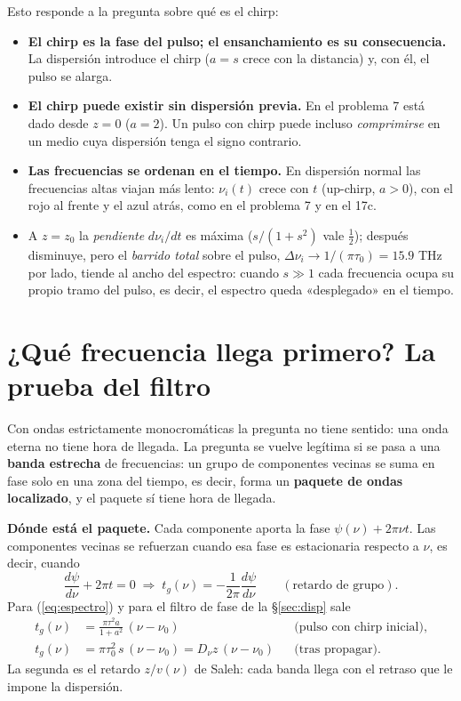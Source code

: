 \documentclass[11pt]{article}
\begin{document}
Esto responde a la pregunta sobre qué es el chirp:
\begin{itemize}
\item \textbf{El chirp es la fase del pulso; el ensanchamiento es su consecuencia.} La dispersión introduce el chirp ($a=s$ crece con la distancia) y, con él, el pulso se alarga.
\item \textbf{El chirp puede existir sin dispersión previa.} En el problema 7 está dado desde $z=0$ ($a=2$). Un pulso con chirp puede incluso \emph{comprimirse} en un medio cuya dispersión tenga el signo contrario.
\item \textbf{Las frecuencias se ordenan en el tiempo.} En dispersión normal las frecuencias altas viajan más lento: $\nu_i(t)$ crece con $t$ (up-chirp, $a>0$), con el rojo al frente y el azul atrás, como en el problema 7 y en el 17c.
\item A $z=z_0$ la \emph{pendiente} $d\nu_i/dt$ es máxima ($s/(1+s^2)$ vale $\tfrac12$); después disminuye, pero el \emph{barrido total} sobre el pulso, $\Delta\nu_i\to1/(\pi\tau_0)=15.9$ THz por lado, tiende al ancho del espectro: cuando $s\gg1$ cada frecuencia ocupa su propio tramo del pulso, es decir, el espectro queda «desplegado» en el tiempo.
\end{itemize}

\section{¿Qué frecuencia llega primero? La prueba del filtro}
Con ondas estrictamente monocromáticas la pregunta no tiene sentido: una onda eterna no tiene hora de llegada. La pregunta se vuelve legítima si se pasa a una \textbf{banda estrecha} de frecuencias: un grupo de componentes vecinas se suma en fase solo en una zona del tiempo, es decir, forma un \textbf{paquete de ondas localizado}, y el paquete sí tiene hora de llegada.

\textbf{Dónde está el paquete.} Cada componente aporta la fase $\psi(\nu)+2\pi\nu t$. Las componentes vecinas se refuerzan cuando esa fase es estacionaria respecto a $\nu$, es decir, cuando
\[
\frac{d\psi}{d\nu}+2\pi t=0\;\Longrightarrow\;t_g(\nu)=-\frac1{2\pi}\frac{d\psi}{d\nu}\qquad(\text{retardo de grupo}).
\]
Para (\ref{eq:espectro}) y para el filtro de fase de la §\ref{sec:disp} sale
\begin{align*}
t_g(\nu)&=\frac{\pi\tau^2a}{1+a^2}\,(\nu-\nu_0)&&\text{(pulso con chirp inicial)},\\
t_g(\nu)&=\pi\tau_0^2\,s\,(\nu-\nu_0)=D_\nu z\,(\nu-\nu_0)&&\text{(tras propagar)}.
\end{align*}
La segunda es el retardo $z/v(\nu)$ de Saleh: cada banda llega con el retraso que le impone la dispersión.
\end{document}

